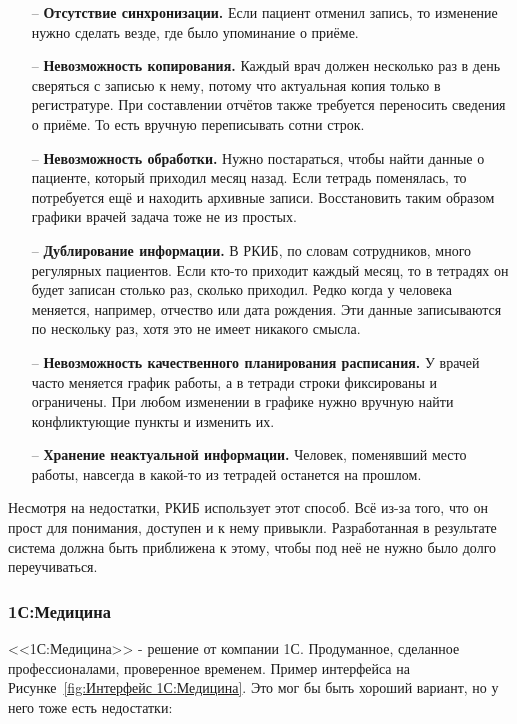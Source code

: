 \documentclass[a4paper,article]{article}
\begin{document}
        \begin{itemize}[nolistsep]
            \item[--] \textbf{Отсутствие синхронизации.} Если пациент отменил запись, то изменение нужно сделать везде, где было упоминание о приёме.
            \item[--] \textbf{Невозможность копирования.} Каждый врач должен несколько раз в день сверяться с записью к нему, потому что актуальная копия только в регистратуре. При составлении отчётов также требуется переносить сведения о приёме. То есть вручную переписывать сотни строк.
            \item[--] \textbf{Невозможность обработки.} Нужно постараться, чтобы найти данные о пациенте, который приходил месяц назад. Если тетрадь поменялась, то потребуется ещё и находить архивные записи. Восстановить таким образом графики врачей задача тоже не из простых.
            \item[--] \textbf{Дублирование информации.} В РКИБ, по словам сотрудников, много регулярных пациентов. Если кто-то приходит каждый месяц, то в тетрадях он будет записан столько раз, сколько приходил. Редко когда у человека меняется, например, отчество или дата рождения. Эти данные записываются по нескольку раз, хотя это не имеет никакого смысла.
            \item[--] \textbf{Невозможность качественного планирования расписания.} У врачей часто меняется график работы, а в тетради строки фиксированы и ограничены. При любом изменении в графике нужно вручную найти конфликтующие пункты и изменить их.
            \item[--] \textbf{Хранение неактуальной информации.} Человек, поменявший место работы, навсегда в какой-то из тетрадей останется на прошлом.
        \end{itemize}

        Несмотря на недостатки, РКИБ использует этот способ. Всё из-за того, что он прост для понимания, доступен и к нему привыкли. Разработанная в результате система должна быть приближена к этому, чтобы под неё не нужно было долго переучиваться.

    \subsubsection{1С:Медицина}

        <<1С:Медицина>> - решение от компании 1С. Продуманное, сделанное профессионалами, проверенное временем. Пример интерфейса на Рисунке~\ref{fig:Интерфейс 1С:Медицина}. Это мог бы быть хороший вариант, но у него тоже есть недостатки:
\end{document}
